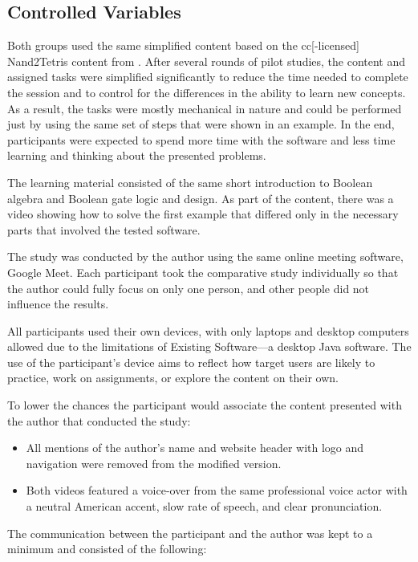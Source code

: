 \subsection{Controlled Variables}

Both groups used the same simplified content based on the \gls{cc}[-licensed] Nand2Tetris content from \textcite{nand2tetris}.
After several rounds of pilot studies, the content and assigned tasks were simplified significantly to reduce the time needed to complete the session and to control for the differences in the ability to learn new concepts.
As a result, the tasks were mostly mechanical in nature and could be performed just by using the same set of steps that were shown in an example.
In the end, participants were expected to spend more time with the software and less time learning and thinking about the presented problems.

The learning material consisted of the same short introduction to Boolean algebra and Boolean gate logic and design.
As part of the content, there was a video showing how to solve the first example that differed only in the necessary parts that involved the tested software.

The study was conducted by the author using the same online meeting software, Google Meet.
Each participant took the comparative study individually so that the author could fully focus on only one person, and other people did not influence the results.

All participants used their own devices, with only laptops and desktop computers allowed due to the limitations of Existing Software---a desktop Java software.
The use of the participant's device aims to reflect how target users are likely to practice, work on assignments, or explore the content on their own.

To lower the chances the participant would associate the content presented with the author that conducted the study:

\begin{itemize}
    \item All mentions of the author's name and website header with logo and navigation were removed from the modified version.
    \item Both videos featured a voice-over from the same professional voice actor with a neutral American accent, slow rate of speech, and clear pronunciation.
\end{itemize}

The communication between the participant and the author was kept to a minimum and consisted of the following:


